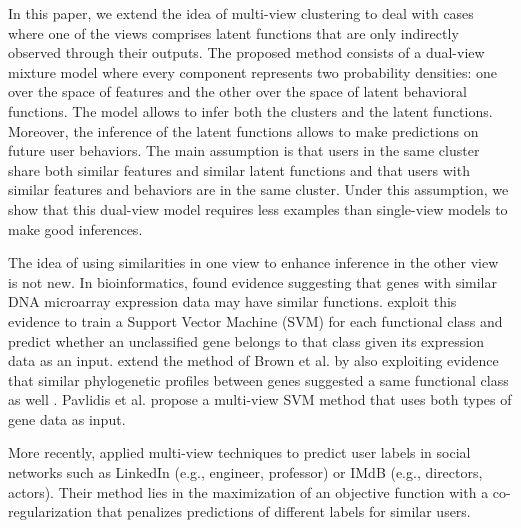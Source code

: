 \documentclass[smallextended]{svjour3}          %
\begin{document}
In this paper, we extend the idea of multi-view clustering to deal with cases where one of the views comprises latent functions that are only indirectly observed through their outputs. The proposed method consists of a dual-view mixture model where every component represents two probability densities: one over the space of features and the other over the space of latent behavioral functions. The model allows to infer both the clusters and the latent functions.  Moreover, the inference of the latent functions allows to make predictions on future user behaviors. The main assumption is that users in the same cluster share both similar features and similar latent functions and that users with similar features and behaviors are in the same cluster. Under this assumption, we show that this dual-view model requires less examples than single-view models to make good inferences.



The idea of using similarities in one view to enhance inference in the other view is not new. In bioinformatics, \cite{Eisen1998} found evidence suggesting that genes with similar DNA microarray expression data may have similar functions. \cite{Brown2000} exploit this evidence to train a Support Vector Machine (SVM) for each functional class and predict whether an unclassified gene belongs to that class given its expression data as an input. \cite{Pavlidis2002} extend the method of Brown et al. by also exploiting evidence that similar phylogenetic profiles between genes suggested a same functional class as well \citep{Pellegrini1999a}. Pavlidis et al. propose a multi-view SVM method that uses both types of gene data as input.

More recently, \cite{Cheng2014} applied multi-view techniques to predict user labels in social networks such as LinkedIn (e.g., engineer, professor) or IMdB (e.g., directors, actors). Their method lies in the maximization of an objective function with a co-regularization that penalizes predictions of different labels for similar users. 

\end{document}
